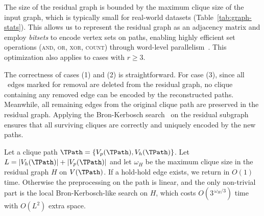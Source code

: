 The size of the residual graph is bounded by the maximum clique size of the input graph, which is typically small for real-world datasets (Table~\ref{tab:graph-stats}). 
This allows us to represent the residual graph as an adjacency matrix and employ \emph{bitsets} to encode vertex sets on paths, enabling highly efficient set operations (\textsc{and}, \textsc{or}, \textsc{xor}, \textsc{count}) through word-level parallelism~\cite{bitsetClique}. This optimization also applies to cases with $r \ge 3$.



The correctness of cases (1) and (2) is straightforward. 
For case (3), since all \pivot{-}\pivot\ edges marked for removal are deleted from the residual graph, no clique containing any removed edge can be encoded by the reconstructed paths. 
Meanwhile, all remaining edges from the original clique path are preserved in the residual graph. 
Applying the Bron-Kerbosch search~\cite{Pivoter} on the residual subgraph ensures that all surviving cliques are correctly and uniquely encoded by the new paths.




Let a clique path $\TPath = \{V_p(\TPath), V_h(\TPath)\}$.
Let $L=|V_h(\TPath)|+|V_p(\TPath)|$ and let $\omega_H$ be the maximum clique size in the residual graph $H$ on $V(\TPath)$. If a hold-hold edge exists, we return in $O(1)$ time. Otherwise the preprocessing on the path is linear, and the only non-trivial part is the local Bron-Kerbosch-like search on $H$, which costs $O(3^{\,\omega_H/3})$ time with $O(L^2)$ extra space.
